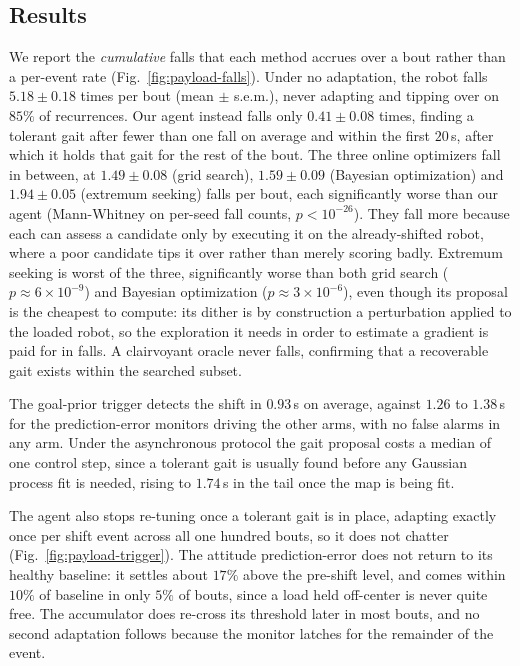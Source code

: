 \documentclass[lettersize,journal]{IEEEtran}
\begin{document}
\subsection{Results}
We report the \emph{cumulative} falls that each method accrues over a bout rather than a per-event rate (Fig.~\ref{fig:payload-falls}).
Under no adaptation, the robot falls $5.18 \pm 0.18$ times per bout (mean $\pm$ s.e.m.), never adapting and tipping over on $85\%$ of recurrences.
Our agent instead falls only $0.41 \pm 0.08$ times, finding a tolerant gait after fewer than one fall on average and within the first $20$\,s, after which it holds that gait for the rest of the bout.
The three online optimizers fall in between, at $1.49 \pm 0.08$ (grid search), $1.59 \pm 0.09$ (Bayesian optimization) and $1.94 \pm 0.05$ (extremum seeking) falls per bout, each significantly worse than our agent (Mann-Whitney on per-seed fall counts, $p < 10^{-26}$).
They fall more because each can assess a candidate only by executing it on the already-shifted robot, where a poor candidate tips it over rather than merely scoring badly.
Extremum seeking is worst of the three, significantly worse than both grid search ($p \approx 6 \times 10^{-9}$) and Bayesian optimization ($p \approx 3 \times 10^{-6}$), even though its proposal is the cheapest to compute: its dither is by construction a perturbation applied to the loaded robot, so the exploration it needs in order to estimate a gradient is paid for in falls.
A clairvoyant oracle never falls, confirming that a recoverable gait exists within the searched subset.

The goal-prior trigger detects the shift in $0.93$\,s on average, against $1.26$ to $1.38$\,s for the prediction-error monitors driving the other arms, with no false alarms in any arm.
Under the asynchronous protocol the gait proposal costs a median of one control step, since a tolerant gait is usually found before any Gaussian process fit is needed, rising to $1.74$\,s in the tail once the map is being fit.

The agent also stops re-tuning once a tolerant gait is in place, adapting exactly once per shift event across all one hundred bouts, so it does not chatter (Fig.~\ref{fig:payload-trigger}).
The attitude prediction-error does not return to its healthy baseline: it settles about $17\%$ above the pre-shift level, and comes within $10\%$ of baseline in only $5\%$ of bouts, since a load held off-center is never quite free.
The accumulator does re-cross its threshold later in most bouts, and no second adaptation follows because the monitor latches for the remainder of the event.
\end{document}
